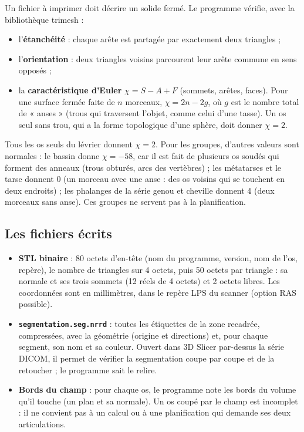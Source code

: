 \documentclass[11pt,a4paper]{article}
\newcommand{\fichier}[1]{\texttt{\small #1}}
\begin{document}
Un fichier à imprimer doit décrire un solide fermé. Le programme vérifie, avec la bibliothèque trimesh :
\begin{itemize}
  \item l'\textbf{étanchéité} : chaque arête est partagée par exactement deux triangles ;
  \item l'\textbf{orientation} : deux triangles voisins parcourent leur arête commune en sens opposés ;
  \item la \textbf{caractéristique d'Euler} $\chi = S - A + F$ (sommets, arêtes, faces). Pour une surface fermée faite
  de $n$ morceaux, $\chi = 2n - 2g$, où $g$ est le nombre total de « anses » (trous qui traversent l'objet, comme
  celui d'une tasse). Un os seul sans trou, qui a la forme topologique d'une sphère, doit donner $\chi = 2$.
\end{itemize}

Tous les os seuls du lévrier donnent $\chi = 2$. Pour les groupes, d'autres valeurs sont normales : le bassin donne
$\chi = -58$, car il est fait de plusieurs os soudés qui forment des anneaux (trous obturés, arcs des vertèbres) ; les
métatarses et le tarse donnent 0 (un morceau avec une anse : des os voisins qui se touchent en deux endroits) ; les
phalanges de la série genou et cheville donnent 4 (deux morceaux sans anse). Ces groupes ne servent pas à la
planification.

\subsection{Les fichiers écrits}

\begin{itemize}
  \item \textbf{STL binaire} : 80 octets d'en-tête (nom du programme, version, nom de l'os, repère), le nombre de
  triangles sur 4 octets, puis 50 octets par triangle : sa normale et ses trois sommets (12 réels de 4 octets) et 2
  octets libres. Les coordonnées sont en millimètres, dans le repère LPS du scanner (option RAS possible).
  \item \textbf{\fichier{segmentation.seg.nrrd}} : toutes les étiquettes de la zone recadrée, compressées, avec la
  géométrie (origine et directions) et, pour chaque segment, son nom et sa couleur. Ouvert dans 3D Slicer par-dessus la
  série DICOM, il permet de vérifier la segmentation coupe par coupe et de la retoucher ; le programme sait le relire.
  \item \textbf{Bords du champ} : pour chaque os, le programme note les bords du volume qu'il touche (un plan et sa
  normale). Un os coupé par le champ est incomplet : il ne convient pas à un calcul ou à une planification qui demande
  ses deux articulations.
\end{itemize}
\end{document}
